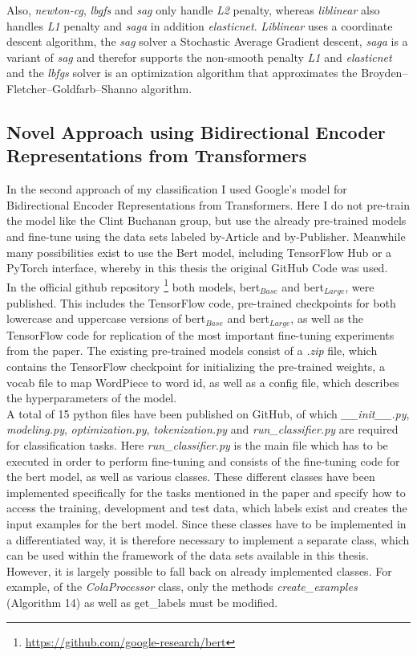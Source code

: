 \documentclass[a4paper, 11pt,titlepage,oneside,openany]{book}
\begin{document}
\newpage \noindent Also, \textit{newton-cg}, \textit{lbgfs} and \textit{sag} only handle \textit{L2} penalty, whereas \textit{liblinear} also handles \textit{L1} penalty and \textit{saga} in addition \textit{elasticnet}. \textit{Liblinear} uses a coordinate descent algorithm, the \textit{sag} solver a Stochastic Average Gradient descent, \textit{saga} is a variant of \textit{sag} and therefor supports the non-smooth penalty \textit{L1} and \textit{elasticnet} and the \textit{lbfgs} solver is an optimization algorithm that approximates the Broyden–Fletcher–Goldfarb–Shanno algorithm.\\


\subsection{Novel Approach using Bidirectional Encoder Representations from Transformers}
In the second approach of my classification I used Google's model for Bidirectional Encoder Representations from Transformers. Here I do not pre-train the model like the Clint Buchanan group, but use the already pre-trained models and fine-tune using the data sets labeled by-Article and by-Publisher. Meanwhile many possibilities exist to use the Bert model, including TensorFlow Hub or a PyTorch \cite{pytorch} interface, whereby in this thesis the original GitHub Code was used.\\
\indent In the official github repository \footnote{\url{https://github.com/google-research/bert}}  both models, \gls{bert}$_{Base}$ and \gls{bert}$_{Large}$, were published. This includes the TensorFlow \cite{tensorflow} code, pre-trained checkpoints for both lowercase and uppercase versions of \gls{bert}$_{Base}$ and \gls{bert}$_{Large}$, as well as the TensorFlow code for replication of the most important fine-tuning experiments from the paper. The existing pre-trained models consist of a \textit{.zip} file, which contains the TensorFlow checkpoint for initializing the pre-trained weights, a vocab file to map WordPiece to word id, as well as a config file, which describes the hyperparameters of the model. \\ 
\indent A total of 15 python files have been published on GitHub, of which \textit{\_\_init\_\_.py}, \textit{modeling.py}, \textit{optimization.py}, \textit{tokenization.py} and \textit{run\_classifier.py} are required for classification tasks. Here \textit{run\_classifier.py} is the main file which has to be executed in order to perform fine-tuning and consists of the fine-tuning code for the \gls{bert} model, as well as various classes. These different classes have been implemented specifically for the tasks mentioned in the paper and specify how to access the training, development and test data, which labels exist and creates the input examples for the \gls{bert} model. Since these classes have to be implemented in a differentiated way, it is therefore necessary to implement a separate class, which can be used within the framework of the data sets available in this thesis. However, it is largely possible to fall back on already implemented classes. For example, of the \textit{ColaProcessor} class, only the methods \textit{ create\_examples} (Algorithm 14) as well as get\_labels must be modified. 
\end{document}
